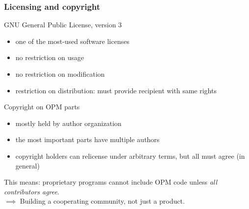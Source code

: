 \documentclass[UKenglish,10pt]{beamer}
\begin{document}
\begin{frame}
  \frametitle{Licensing and copyright}
  \begin{block}{GNU General Public License, version 3}
    \begin{itemize}
    \item one of the most-used software licenses
    \item no restriction on usage 
    \item no restriction on modification
    \item restriction on distribution: must provide recipient with same rights
    \end{itemize}
  \end{block}
  \begin{block}{Copyright on OPM parts}
    \begin{itemize}
    \item mostly held by author organization
    \item the most important parts have multiple authors
    \item copyright holders can relicense under arbitrary terms, but all
      must agree (in general)
    \end{itemize}
  \end{block}
  This means: proprietary programs cannot include OPM code unless {\em all
  contributors agree}. \\
  $\implies$ Building a cooperating community, not just a product.
\end{frame}
\end{document}
